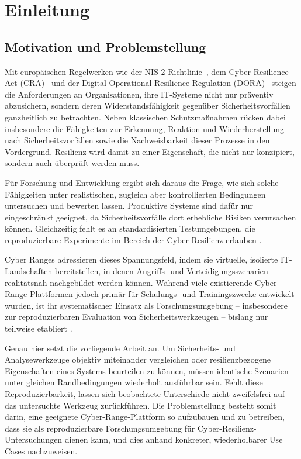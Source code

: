 \chapter{Einleitung}
\label{chap:einleitung}

\section{Motivation und Problemstellung}
\label{sec:motivation}

Mit europäischen Regelwerken wie der NIS-2-Richtlinie~\cite{NIS2Directive},
dem Cyber Resilience Act (CRA)~\cite{CyberResilienceAct} und der Digital
Operational Resilience Regulation (DORA)~\cite{DORARegulation} steigen die
Anforderungen an Organisationen, ihre IT-Systeme nicht nur präventiv abzusichern, sondern deren Widerstandsfähigkeit gegenüber Sicherheitsvorfällen ganzheitlich zu betrachten. Neben klassischen Schutzmaßnahmen rücken dabei insbesondere die Fähigkeiten zur Erkennung, Reaktion und Wiederherstellung nach Sicherheitsvorfällen sowie die Nachweisbarkeit dieser Prozesse in den Vordergrund. Resilienz wird damit zu einer Eigenschaft, die nicht nur konzipiert, sondern auch überprüft werden muss.

Für Forschung und Entwicklung ergibt sich daraus die Frage, wie sich solche Fähigkeiten
unter realistischen, zugleich aber kontrollierten Bedingungen untersuchen und bewerten
lassen. Produktive Systeme sind dafür nur eingeschränkt geeignet, da Sicherheitsvorfälle
dort erhebliche Risiken verursachen können. Gleichzeitig fehlt es an
standardisierten Testumgebungen, die reproduzierbare Experimente im Bereich der
Cyber-Resilienz erlauben \cite{Chouliaras2021}.

Cyber Ranges adressieren dieses Spannungsfeld, indem sie virtuelle, isolierte
IT-Landschaften bereitstellen, in denen Angriffs- und Verteidigungsszenarien realitätsnah
nachgebildet werden können. Während viele existierende Cyber-Range-Plattformen jedoch
primär für Schulungs- und Trainingszwecke entwickelt wurden, ist ihr systematischer
Einsatz als Forschungsumgebung -- insbesondere zur reproduzierbaren Evaluation von
Sicherheitswerkzeugen -- bislang nur teilweise etabliert \cite{IntroductionCyberRanges2022}.

Genau hier setzt die vorliegende Arbeit an. Um Sicherheits- und Analysewerkzeuge
objektiv miteinander vergleichen oder resilienzbezogene Eigenschaften eines Systems
beurteilen zu können, müssen identische Szenarien unter gleichen Randbedingungen
wiederholt ausführbar sein. Fehlt diese Reproduzierbarkeit, lassen sich beobachtete
Unterschiede nicht zweifelsfrei auf das untersuchte Werkzeug zurückführen. Die
Problemstellung besteht somit darin, eine geeignete Cyber-Range-Plattform so aufzubauen
und zu betreiben, dass sie als reproduzierbare Forschungsumgebung für
Cyber-Resilienz-Untersuchungen dienen kann, und dies anhand konkreter, wiederholbarer
Use Cases nachzuweisen.

